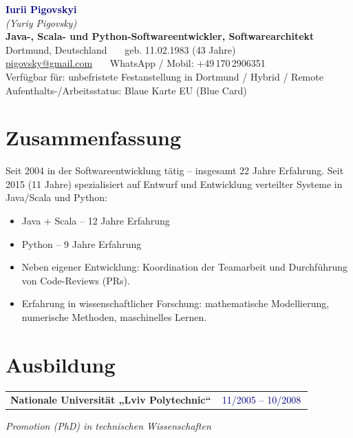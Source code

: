 \documentclass[10pt,a4paper]{article}
\makeatletter
\newcommand{\entryrow}[2]{%
  \noindent\begin{tabularx}{\linewidth}{@{}X@{\hspace{8pt}}r@{}}
  \textbf{#1} & \colorbox{navyfaint}{\footnotesize\textcolor{navy}{\,#2\,}}\\
  \end{tabularx}%
}
\newcommand{\role}[1]{{\itshape\footnotesize\color{gray1}#1}\par\vspace{0.5pt}}
\makeatother
\begin{document}
\begin{tcolorbox}[
  colback=navyfaint, colframe=navyfaint, boxrule=0pt, arc=3pt,
  width=\linewidth, left=16pt, right=16pt, top=7pt, bottom=7pt,
  before skip=0pt, after skip=7pt
]
{\fontsize{22}{24}\selectfont\bfseries\textcolor{navy}{Iurii Pigovskyi}}\\[1pt]
{\itshape\color{gray1}(Yuriy Pigovsky)}\\[5pt]
{\large\bfseries Java-, Scala- und Python-Softwareentwickler, Softwarearchitekt}\\[5pt]
Dortmund, Deutschland \ \textbar\ \ geb. 11.02.1983 (43 Jahre)\\
\href{mailto:pigovsky@gmail.com}{pigovsky@gmail.com} \ \textbar\ \ WhatsApp / Mobil: +49\,170\,2906351\\
Verfügbar für: unbefristete Festanstellung in Dortmund / Hybrid / Remote\\
Aufenthalts-/Arbeitsstatus: Blaue Karte EU (Blue Card)
\end{tcolorbox}

\section*{Zusammenfassung}
Seit 2004 in der Softwareentwicklung tätig -- insgesamt 22 Jahre Erfahrung. Seit 2015 (11 Jahre) spezialisiert auf Entwurf und Entwicklung verteilter Systeme in Java/Scala und Python:
\begin{itemize}
  \item Java + Scala -- 12 Jahre Erfahrung
  \item Python -- 9 Jahre Erfahrung
  \item Neben eigener Entwicklung: Koordination der Teamarbeit und Durchführung von Code-Reviews (PRs).
  \item Erfahrung in wissenschaftlicher Forschung: mathematische Modellierung, numerische Methoden, maschinelles Lernen.
\end{itemize}

\section*{Ausbildung}
\entryrow{Nationale Universität „Lviv Polytechnic“}{11/2005 -- 10/2008}
\role{Promotion (PhD) in technischen Wissenschaften}
\vspace{2pt}
\end{document}
